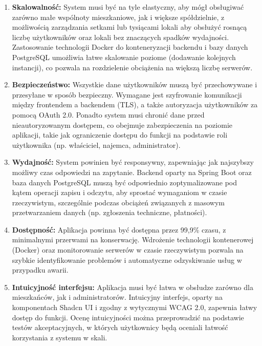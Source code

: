 \begin{enumerate}[label=\arabic*.] 

	\item \textbf{Skalowalność:} System musi być na tyle elastyczny, aby mógł obsługiwać zarówno małe wspólnoty mieszkaniowe, jak i większe spółdzielnie, z możliwością zarządzania setkami lub tysiącami lokali aby obsłużyć rosnącą liczbę użytkowników oraz lokali bez znaczących spadków wydajności. Zastosowanie technologii Docker do konteneryzacji backendu i bazy danych PostgreSQL umożliwia łatwe skalowanie poziome (dodawanie kolejnych instancji), co pozwala na rozdzielenie obciążenia na większą liczbę serwerów.

	\item \textbf{Bezpieczeństwo:} Wszystkie dane użytkowników muszą być przechowywane i przesyłane w sposób bezpieczny. Wymagane jest szyfrowanie komunikacji między frontendem a backendem (TLS), a także autoryzacja użytkowników za pomocą OAuth 2.0. Ponadto system musi chronić dane przed nieautoryzowanym dostępem, co obejmuje zabezpieczenia na poziomie aplikacji, takie jak ograniczenie dostępu do funkcji na podstawie roli użytkownika (np. właściciel, najemca, administrator).

	\item \textbf{Wydajność:} System powinien być responsywny, zapewniając jak najszybszy możliwy czas odpowiedzi na zapytanie. Backend oparty na Spring Boot oraz baza danych PostgreSQL muszą być odpowiednio zoptymalizowane pod kątem operacji zapisu i odczytu, aby sprostać wymaganiom w czasie rzeczywistym, szczególnie podczas obciążeń związanych z masowym przetwarzaniem danych (np. zgłoszenia techniczne, płatności).

	\item \textbf{Dostępność:} Aplikacja powinna być dostępna przez 99,9\% czasu, z minimalnymi przerwami na konserwację. Wdrożenie technologii kontenerowej (Docker) oraz monitorowanie serwerów w czasie rzeczywistym pozwala na szybkie identyfikowanie problemów i automatyczne odzyskiwanie usług w przypadku awarii.

	\item \textbf{Intuicyjność interfejsu:} Aplikacja musi być łatwa w obsłudze zarówno dla mieszkańców, jak i administratorów. Intuicyjny interfejs, oparty na komponentach Shadcn UI i zgodny z wytycznymi WCAG 2.0, zapewnia łatwy dostęp do funkcji. Ocenę intuicyjności można przeprowadzić na podstawie testów akceptacyjnych, w których użytkownicy będą oceniali łatwość korzystania z systemu w skali.
	

\end{enumerate}
